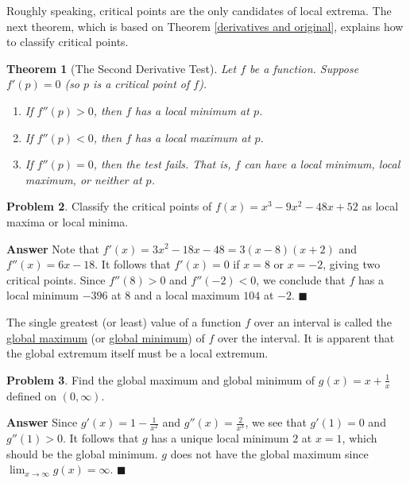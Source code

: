 \documentclass[12pt,letterpaper]{book}
\numberwithin{equation}{section}
\newtheorem{thm}{\textbf{Theorem}}[section]
\theoremstyle{definition}
\newtheorem{problem}[thm]{\textbf{Problem}}
\newenvironment{answer}{\noindent\textbf{Answer}}{\hfill$\blacksquare$\vspace{0.1in}}
\begin{document}
Roughly speaking, critical points are the only candidates of local extrema. The next theorem, which is based on Theorem \ref{derivatives and original},  explains how to classify critical points.

\begin{thm}[The Second Derivative Test] Let $f$ be a function. Suppose $f'(p)=0$ (so $p$ is a critical point of $f$).
\begin{enumerate}
\item If $f''(p)>0$, then $f$ has a local minimum at $p$.
\item If $f''(p)<0$, then $f$ has a local maximum at $p$.
\item If $f''(p)=0$, then the test fails. That is, $f$ can have a local minimum, local maximum, or neither at $p$.
\end{enumerate}
\end{thm}

\begin{problem}\label{polyextreme} Classify the critical points of $f(x)=x^3-9x^2-48x+52$ as local maxima or local minima.
\end{problem}

\begin{answer} Note that $f'(x)=3x^2-18x-48=3(x-8)(x+2)$ and $f''(x)=6x-18$. It follows that $f'(x)=0$ if $x=8$ or $x=-2$, giving two critical points. Since $f''(8)>0$ and $f''(-2)<0$, we conclude that $f$ has a local minimum $-396$ at $8$ and a local maximum $104$ at $-2$.
\end{answer}

 The single greatest (or least) value of a function $f$ over an interval is called the \underline{global maximum} (or \underline{global minimum}) of $f$ over the interval. It is apparent that the global extremum itself must be a local extremum.

\begin{problem} Find the global maximum and global minimum of $g(x)=x+\frac{1}{x}$ defined on $(0,\infty)$.
\end{problem}

\begin{answer}
Since $g'(x)=1-\frac{1}{x^2}$ and $g''(x)=\frac{2}{x^3}$, we see that $g'(1)=0$ and $g''(1)>0$. It follows that $g$ has a unique local minimum $2$ at $x=1$, which should be the global minimum. $g$ does not have the global maximum since $\displaystyle{\lim_{x\to \infty}g(x)=\infty}$.
\end{answer}
\end{document}
